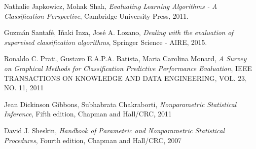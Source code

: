 \begin{thebibliography}{99}

  Nathalie Japkowicz, Mohak Shah,
  \emph{Evaluating Learning Algorithms - A Classification Perspective},
  Cambridge University Press,
  2011.

  Guzmán Santafé, Iñaki Inza, José A. Lozano,
  \emph{Dealing with the evaluation of supervised classification algorithms},
  Springer Science - AIRE,
  2015.
  
  Ronaldo C. Prati, Gustavo E.A.P.A. Batista, Maria Carolina Monard,
  \emph{A Survey on Graphical Methods for Classification Predictive Performance Evaluation},
  IEEE TRANSACTIONS ON KNOWLEDGE AND DATA ENGINEERING, VOL. 23, NO. 11,
  2011

  Jean Dickinson Gibbons, Subhabrata Chakraborti,
  \emph{Nonparametric Statistical Inference},
  Fifth edition,
  Chapman and Hall/CRC,
  2011
	
  David J. Sheskin,
  \emph{Handbook of Parametric and Nonparametric Statistical Procedures},
  Fourth edition,
  Chapman and Hall/CRC,
  2007
  
\end{thebibliography}